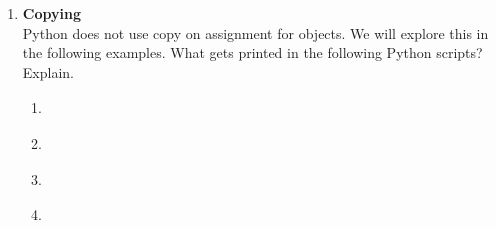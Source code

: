 \documentclass{article}
\newcounter{points}
\newcommand\printpoints{Total number of points: \thepoints}
\begin{document}
\begin{enumerate}
\item \textbf{Copying} \\
Python does not use copy on assignment for objects.  We will explore this in the following examples.  What gets printed in the following Python scripts?  Explain.

\begin{enumerate}
\item
\begin{tabular}{c}

\end{tabular}
\end{enumerate}

\vspace{0.05in}

\begin{enumerate}
\setcounter{enumii}{1}
\item
\begin{tabular}{c}

\end{tabular}
\end{enumerate}

\vspace{0.05in}

\begin{enumerate}
\setcounter{enumii}{2}
\item
\begin{tabular}{c}

\end{tabular}
\end{enumerate}

\vspace{0.05in}

\begin{enumerate}
\setcounter{enumii}{3}
\item
\begin{tabular}{c}

\end{tabular}
\end{enumerate}




\end{enumerate}
\end{document}
